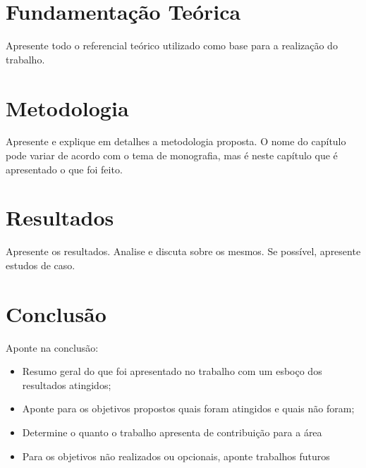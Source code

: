 \documentclass[
12pt,				%
openright,			%
oneside,			%
a4paper,			%
english,			%
french,				%
spanish,			%
brazil				%
]{abntex2}
\begin{document}
\chapter{Fundamentação Teórica}
\label{chap:fundamentacao}
Apresente todo o referencial teórico utilizado como base para a realização do trabalho.



\chapter{Metodologia}
\label{chap:metodologia}
Apresente e explique em detalhes a metodologia proposta. O nome do capítulo pode variar de acordo com o tema de monografia, mas é neste capítulo que é apresentado o que foi feito.



\chapter{Resultados}
\label{chap:resultados}
Apresente os resultados. Analise e discuta sobre os mesmos. Se possível, apresente estudos de caso.

	
\chapter{Conclusão}
\label{chap:conclusao}

Aponte na conclusão:
\begin{itemize}
    \item Resumo geral do que foi apresentado no trabalho com um esboço dos resultados atingidos;
    \item Aponte para os objetivos propostos quais foram atingidos e quais não foram;
    \item Determine o quanto o trabalho apresenta de contribuição para a área
    \item Para os objetivos não realizados ou opcionais, aponte trabalhos futuros
\end{itemize}
\end{document}
